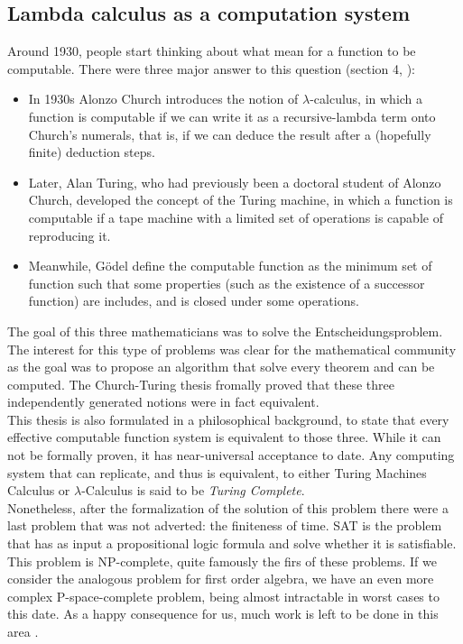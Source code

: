 \subsection{Lambda calculus as a computation system}
Around 1930, people start thinking about what mean for a function to be computable. There were three major answer to this question (section 4, \cite{cardone2006history}):
\begin{itemize}
\item In 1930s Alonzo Church introduces the notion of $\lambda$-calculus, in which a function is computable if we can write it as a recursive-lambda term onto Church's numerals, that is, if we can deduce the result after a (hopefully finite) deduction steps.
\item Later, Alan Turing, who had previously been a doctoral student of Alonzo Church, developed the concept of the Turing machine, in which a function is computable if a tape machine with a limited set of operations is capable of reproducing it.
\item Meanwhile, Gödel define the computable function as the minimum set of function such that some properties (such as the existence of a successor function) are includes, and is closed under some operations. 
\end{itemize}

The goal of this three mathematicians was to solve the Entscheidungsproblem\cite{hilbert1999principles}.\\

The interest for this type of problems was clear for the mathematical community as the goal was to propose an algorithm that solve every theorem and can be computed. The Church-Turing thesis fromally proved that these three independently generated notions were in fact equivalent\cite{copeland1997church}.\\


This thesis is also formulated in a philosophical background, to state that every effective computable function system is equivalent to those three. While it can not be formally proven, it has near-universal acceptance to date. Any computing system that can replicate, and thus is equivalent, to either Turing Machines Calculus or $\lambda$-Calculus is said to be \emph{Turing Complete}.\\

Nonetheless, after the formalization of the solution of this problem there were a last problem that was not adverted: the finiteness of time. SAT is the problem that has as input a propositional logic formula and solve whether it is satisfiable. This problem is NP-complete, quite famously the firs of these problems\cite{cook1971complexity}. If we consider the analogous problem for first order algebra, we have an even more complex P-space-complete problem, being almost intractable in worst cases to this date. As a happy consequence for us, much work is left to be done in this area \cite{cook2006p}. 

